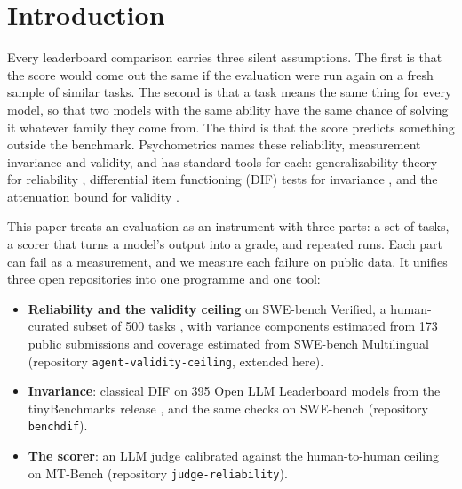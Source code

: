 \documentclass[11pt]{article}
\begin{document}
\section{Introduction}

Every leaderboard comparison carries three silent assumptions. The first is that the score would come out the same if the evaluation were run again on a fresh sample of similar tasks. The second is that a task means the same thing for every model, so that two models with the same ability have the same chance of solving it whatever family they come from. The third is that the score predicts something outside the benchmark. Psychometrics names these reliability, measurement invariance and validity, and has standard tools for each: generalizability theory for reliability \citep{cronbach1972dependability,brennan2001generalizability}, differential item functioning (DIF) tests for invariance \citep{holland1988dif,swaminathan1990logistic,meredith1993measurement}, and the attenuation bound for validity \citep{spearman1904proof}.

This paper treats an evaluation as an instrument with three parts: a set of tasks, a scorer that turns a model's output into a grade, and repeated runs. Each part can fail as a measurement, and we measure each failure on public data. It unifies three open repositories into one programme and one tool:
\begin{itemize}
\item \textbf{Reliability and the validity ceiling} on SWE-bench \citep{jimenez2024swebench} Verified, a human-curated subset of 500 tasks \citep{yang2025swesmith}, with variance components estimated from 173 public submissions and coverage estimated from SWE-bench Multilingual \citep{yang2025swesmith} (repository \texttt{agent-validity-ceiling}, extended here).
\item \textbf{Invariance}: classical DIF on 395 Open LLM Leaderboard models from the tinyBenchmarks release \citep{polo2024tinybenchmarks}, and the same checks on SWE-bench (repository \texttt{benchdif}).
\item \textbf{The scorer}: an LLM judge calibrated against the human-to-human ceiling on MT-Bench \citep{zheng2023judging} (repository \texttt{judge-reliability}).
\end{itemize}
\end{document}
